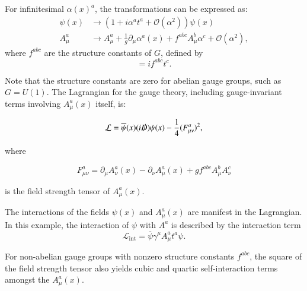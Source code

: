 For infinitesimal $\alpha(x)^a$, the transformations can be expressed as:
\begin{align}\label{eqn:gauge-field-transformation-infinitesimal}
	\psi(x)&\rightarrow (1 + i\alpha^a t^a + \mathcal{O}(\alpha^2))\psi(x) \\
	A^a_{\mu} &\rightarrow A_{\mu}^a + \frac{1}{g}\partial_{\mu}\alpha^a(x) + f^{abc}A^b_{\mu}\alpha^c + \mathcal{O}(\alpha^2),
\end{align}
where $f^{abc}$ are the structure constants of $G$, defined by
\begin{equation}
	[t^a,\ t^b] = if^{abc}t^c.
\end{equation}

Note that the structure constants are zero for abelian gauge groups, such as $G=U(1)$. The Lagrangian for the gauge theory, including gauge-invariant terms involving $A^a_{\mu}(x)$ itself, is:

\begin{equation}\label{eqn:simple-gauge-lagrangian}
	\mathcal{L} = \overline{\psi}(x) (i\slashed{D}) \psi(x) - \frac{1}{4} (F^a_{\mu\nu})^2,
\end{equation}

where 

\begin{equation}\label{eqn:field-strength-tensor}
	F_{\mu\nu}^a=\partial_{\mu}A^a_{\nu}(x) - \partial_{\nu} A^a_{\mu}(x) + g f^{abc}A_{\mu}^b A_{\nu}^c
\end{equation}

 is the field strength tensor of $A^a_{\mu}(x)$. 

The interactions of the fields $\psi(x)$ and $A^a_{\mu}(x)$ are manifest in the Lagrangian. In this example, the interaction of $\psi$ with $A^a$ is described by the interaction term
\begin{equation}
	\mathcal{L}_{\mathrm{int}} = \overline{\psi} \gamma^{\mu}A^a_{\mu}t^a \psi.
\end{equation}

For non-abelian gauge groups with nonzero structure constants $f^{abc}$, the square of the field strength tensor also yields cubic and quartic self-interaction terms amongst the $A^a_{\mu}(x)$.



